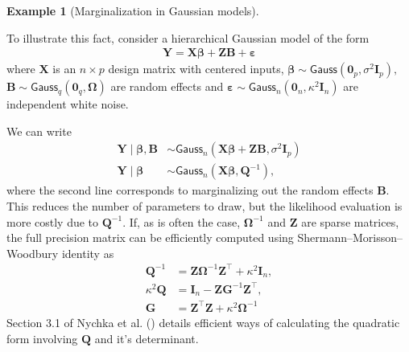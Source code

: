 \documentclass[
  11pt,
  letterpaper,
]{scrbook}
\theoremstyle{definition}
\newtheorem{example}{Example}[chapter]
\theoremstyle{plain}
\theoremstyle{plain}
\theoremstyle{plain}
\theoremstyle{definition}
\theoremstyle{definition}
\theoremstyle{plain}
\theoremstyle{plain}
\theoremstyle{remark}
\begin{document}
\begin{example}[Marginalization in Gaussian
models]\protect\hypertarget{exm-marginalization-Gauss}{}\label{exm-marginalization-Gauss}

To illustrate this fact, consider a hierarchical Gaussian model of the
form \begin{align*}
\boldsymbol{Y} = \mathbf{X}\boldsymbol{\beta} + \mathbf{Z}\boldsymbol{B} + \boldsymbol{\varepsilon}
\end{align*} where \(\mathbf{X}\) is an \(n \times p\) design matrix
with centered inputs,
\(\boldsymbol{\beta} \sim \mathsf{Gauss}(\boldsymbol{0}_p, \sigma^2\mathbf{I}_p),\)
\(\boldsymbol{B}\sim \mathsf{Gauss}_q(\boldsymbol{0}_q, \boldsymbol{\Omega})\)
are random effects and
\(\boldsymbol{\varepsilon} \sim \mathsf{Gauss}_n(\boldsymbol{0}_n, \kappa^2\mathbf{I}_n)\)
are independent white noise.

We can write \begin{align*}
\boldsymbol{Y} \mid \boldsymbol{\beta}, \boldsymbol{B} &\sim \mathsf{Gauss}_n(\mathbf{X}\boldsymbol{\beta} + \mathbf{Z}\boldsymbol{B},  \sigma^2\mathbf{I}_p)\\
\boldsymbol{Y} \mid \boldsymbol{\beta} &\sim \mathsf{Gauss}_n(\mathbf{X}\boldsymbol{\beta}, \mathbf{Q}^{-1}),
\end{align*} where the second line corresponds to marginalizing out the
random effects \(\boldsymbol{B}.\) This reduces the number of parameters
to draw, but the likelihood evaluation is more costly due to
\(\mathbf{Q}^{-1}\). If, as is often the case,
\(\boldsymbol{\Omega}^{-1}\) and \(\mathbf{Z}\) are sparse matrices, the
full precision matrix can be efficiently computed using
Shermann--Morisson--Woodbury identity as \begin{align*}
\mathbf{Q}^{-1} &=   \mathbf{Z}\boldsymbol{\Omega}^{-1}\mathbf{Z}^\top + \kappa^2 \mathbf{I}_n,\\
\kappa^2\mathbf{Q} & = \mathbf{I}_n - \mathbf{Z} \boldsymbol{G}^{-1} \mathbf{Z}^\top,\\
\boldsymbol{G} &= \mathbf{Z}^\top\mathbf{Z} + \kappa^2 \boldsymbol{\Omega}^{-1}
\end{align*} Section 3.1 of Nychka et al.
() details efficient ways of calculating
the quadratic form involving \(\mathbf{Q}\) and it's determinant.

\end{example}
\end{document}
